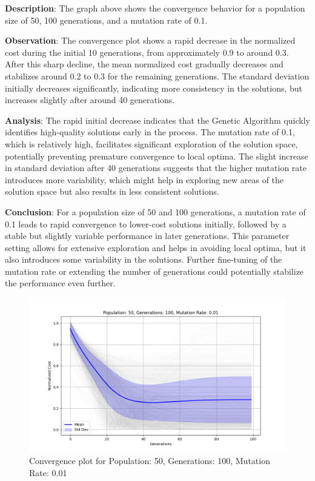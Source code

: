 \documentclass[
]{article}
\begin{document}
    \textbf{Description}: The graph above shows the convergence behavior for a population size of 50, 100 generations, and a mutation rate of 0.1.

    \textbf{Observation}: The convergence plot shows a rapid decrease in the normalized cost during the initial 10 generations, from approximately 0.9 to around 0.3. After this sharp decline, the mean normalized cost gradually decreases and stabilizes around 0.2 to 0.3 for the remaining generations. The standard deviation initially decreases significantly, indicating more consistency in the solutions, but increases slightly after around 40 generations.

    \textbf{Analysis}: The rapid initial decrease indicates that the Genetic Algorithm quickly identifies high-quality solutions early in the process. The mutation rate of 0.1, which is relatively high, facilitates significant exploration of the solution space, potentially preventing premature convergence to local optima. The slight increase in standard deviation after 40 generations suggests that the higher mutation rate introduces more variability, which might help in exploring new areas of the solution space but also results in less consistent solutions.

    \textbf{Conclusion}: For a population size of 50 and 100 generations, a mutation rate of 0.1 leads to rapid convergence to lower-cost solutions initially, followed by a stable but slightly variable performance in later generations. This parameter setting allows for extensive exploration and helps in avoiding local optima, but it also introduces some variability in the solutions. Further fine-tuning of the mutation rate or extending the number of generations could potentially stabilize the performance even further.

    \begin{figure}[H]
        \centering
        \includegraphics[width=\textwidth]{genetic_algorithm/Population_50_Generations_100_MutationRate_0.01}
        \caption{Convergence plot for Population: 50, Generations: 100, Mutation Rate: 0.01}
        \label{fig:ga_50_100_01}
    \end{figure}
\end{document}
